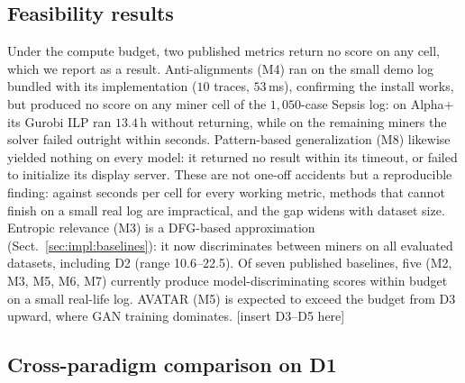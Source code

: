 \documentclass[runningheads]{llncs}
\begin{document}
\subsection{Feasibility results}
\label{sec:eval:feasibility}
Under the compute budget, two published metrics return no score on any cell, which we report as a result. Anti-alignments (M4) ran on the small demo log bundled with its implementation ($10$ traces, $53$\,ms), confirming the install works, but produced no score on any miner cell of the $1{,}050$-case Sepsis log: on Alpha+ its Gurobi ILP ran $13.4$\,h without returning, while on the remaining miners the solver failed outright within seconds. Pattern-based generalization (M8) likewise yielded nothing on every model: it returned no result within its timeout, or failed to initialize its display server. These are not one-off accidents but a reproducible finding: against seconds per cell for every working metric, methods that cannot finish on a small real log are impractical, and the gap widens with dataset size. Entropic relevance (M3) is a DFG-based approximation (Sect.~\ref{sec:impl:baselines}): it now discriminates between miners on all evaluated datasets, including D2 (range 10.6--22.5). Of seven published baselines, five (M2, M3, M5, M6, M7) currently produce model-discriminating scores within budget on a small real-life log. AVATAR (M5) is expected to exceed the budget from D3 upward, where GAN training dominates. [insert D3--D5 here]

\subsection{Cross-paradigm comparison on D1}
\label{sec:eval:external}
\end{document}

